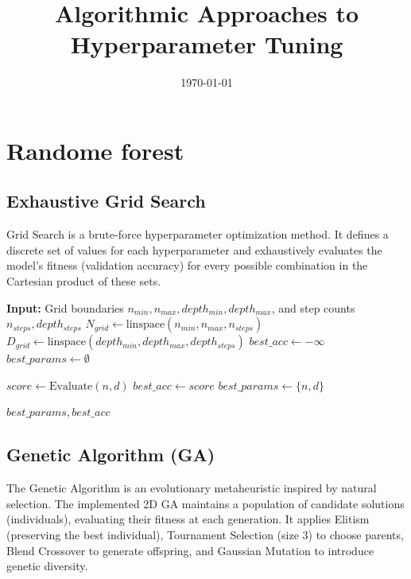 \documentclass[12pt, a4paper]{article}
\title{\textbf{Algorithmic Approaches to Hyperparameter Tuning}}
\date{\today}
\begin{document}
\maketitle
\section{Randome forest}
\subsection{Exhaustive Grid Search}
Grid Search is a brute-force hyperparameter optimization method. It defines a discrete set of values for each hyperparameter and exhaustively evaluates the model's fitness (validation accuracy) for every possible combination in the Cartesian product of these sets.

\begin{algorithm}[H]
\caption{2D Grid Search}
\begin{algorithmic}[1]
\State \textbf{Input:} Grid boundaries $n_{min}, n_{max}, depth_{min}, depth_{max}$, and step counts $n_{steps}, depth_{steps}$
\State $N_{grid} \leftarrow \text{linspace}(n_{min}, n_{max}, n_{steps})$
\State $D_{grid} \leftarrow \text{linspace}(depth_{min}, depth_{max}, depth_{steps})$
\State $best\_acc \leftarrow -\infty$
\State $best\_params \leftarrow \emptyset$

        \State $score \leftarrow \text{Evaluate}(n, d)$ 
            \State $best\_acc \leftarrow score$
            \State $best\_params \leftarrow \{n, d\}$
        \EndIf
    \EndFor
\EndFor

\State \Return $best\_params, best\_acc$
\end{algorithmic}
\end{algorithm}

\subsection{Genetic Algorithm (GA)}
The Genetic Algorithm is an evolutionary metaheuristic inspired by natural selection. The implemented 2D GA maintains a population of candidate solutions (individuals), evaluating their fitness at each generation. It applies Elitism (preserving the best individual), Tournament Selection (size 3) to choose parents, Blend Crossover to generate offspring, and Gaussian Mutation to introduce genetic diversity.
\end{document}
